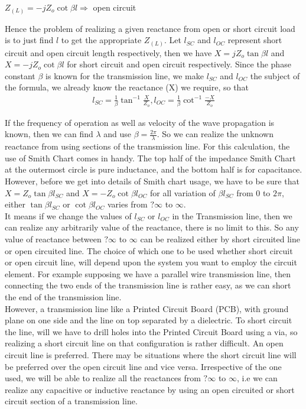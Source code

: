 \begin{center}
$ Z_{(L)} = -jZ_o\cot\beta l \Rightarrow $ open circuit
\end{center}
Hence the problem of realizing a given reactance from open or short circuit load is to just find $ l $ to get the appropriate $Z_{(L)}$. 
Let $l_{SC}$ and $l_{OC}$ represent short circuit and open circuit length respectively, then we have $ X = jZ_o\tan\beta l $ and $ X = -jZ_o\cot\beta l $ for short circuit and open circuit respectively. Since the phase constant $ \beta $ is known for the transmission line, we make $ l_{SC} $ and $ l_{OC} $ the subject of the formula, we already know the reactance (X) we require, so that 
\begin{align}
l_{SC} = \frac{1}{\beta}\tan^{-1}\frac{X}{Z_o}, l_{OC} = \frac{1}{\beta}\cot^{-1}\frac{-X}{Z_o}
\end{align}

If the frequency of operation as well as velocity of the wave propagation is known, then we can find $\lambda$ and use $ \beta = \frac{2\pi}{\lambda} $. So we can realize the unknown reactance from using sections of the transmission line. For this calculation, the use of Smith Chart comes in handy. The top half of the impedance Smith Chart at the 
outermost circle is pure inductance, and the bottom half is for capacitance.
However, before we get into details of Smith chart usage, we have to be sure that $ X = Z_o\tan\beta l_{SC} $ and $ X = -Z_o\cot\beta l_{OC} $ for all variation of $ \beta l_{SC} $  from 0 to $ 2\pi $, either $ \tan\beta l_{SC} $ or $ \cot\beta l_{OC} $ varies from $ ?\infty$ to $\infty $.\\

It means if we change the values of $ l_{SC} $ or $ l_{OC} $ in the Transmission line, then we can realize any arbitrarily value of the reactance, there is no limit to this. So any value of reactance between $ ?\infty$ to $\infty $ can be realized either by short circuited line or open circuited line. The choice of which one to be used whether short circuit or open circuit line, will depend upon the system you want to employ the circuit element.
For example supposing we have a parallel wire transmission line, then connecting the two ends of the transmission line is rather easy, as we can short the end of the transmission line.\\

However, a transmission line like a Printed Circuit Board (PCB), with ground plane on one side and the line on top separated by a dielectric. To short circuit the line, will we have to drill holes into the Printed Circuit Board using a via, so realizing a short circuit line on that configuration is rather difficult. An open circuit line is preferred. There may be situations where the short circuit line will be preferred over the open circuit line and vice versa. Irrespective of the one used, we will be able to realize all the reactances from  $ ?\infty$ to $\infty $, i.e we can realize any capacitive or inductive reactance by using an open circuited or short circuit section of a transmission line.\\

